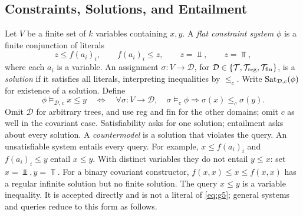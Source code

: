 \subsection{Constraints, Solutions, and Entailment}
Let $V$ be a finite set of $k$ variables containing $x,y$. A \emph{flat constraint system} $\phi$ is a finite conjunction of literals
\begin{equation}\label{eq:g5}
 z\le f(a_i)_i,\qquad f(a_i)_i\le z,\qquad z=\Bot,\qquad z=\Top,
\end{equation}
where each $a_i$ is a variable. An assignment $\sigma:V\to\mathcal D$, for
$\mathcal D\in\{\mathcal{T},\mathcal{T}_{\mathrm{reg}},\mathcal{T}_{\mathrm{fin}}\}$, is a
\emph{solution} if it satisfies all literals, interpreting inequalities by
$\le_c$. Write $\operatorname{Sat}_{\mathcal D,c}(\phi)$ for existence of a solution. Define
\begin{equation}\label{eq:g6}
 \phi\models_{\mathcal D,c}x\le y\quad\Longleftrightarrow\quad
 \forall\sigma:V\to\mathcal D,\quad\sigma\models_c\phi\Longrightarrow
 \sigma(x)\le_c\sigma(y).
\end{equation}
Omit $\mathcal D$ for arbitrary trees, and use $\mathrm{reg}$ and $\mathrm{fin}$
for the other domains; omit $c$ as well in the covariant case.
Satisfiability asks for one solution; entailment asks
about every solution. A \emph{countermodel} is a solution that violates
the query. An unsatisfiable system entails every query.
For example, $x\le f(a_i)_i$ and $f(a_i)_i\le y$ entail $x\le y$.
With distinct variables they do not entail $y\le x$: set $x=\Bot,y=\Top$.
For a binary covariant constructor, $f(x,x)\le x\le f(x,x)$ has a regular
infinite solution but no finite solution.
The query $x\le y$ is a variable inequality. It is accepted directly and is
not a literal of \eqref{eq:g5}; general systems and queries reduce to this
form as follows.


